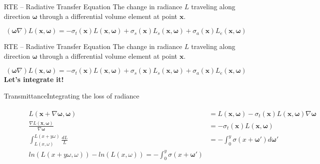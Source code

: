\documentclass[
  english,            %
  aspectratio=169,    %
]{tumbeamer}
\newcommand\bx[0]{\textbf{x}}
\newcommand\bomega[0]{\boldsymbol{\omega}}
\begin{document}
\begin{frame}{RTE -- Radiative Transfer Equation}
    The change in radiance $L$ traveling along direction $\boldsymbol{\omega}$
    through a differential volume element at point $\boldsymbol{x}$.
    \begin{figure}[ht]
        \centering
        \scalebox{.7}{
            
        }
    \end{figure}
    \begin{equation} 
        \label{eq:RTE}
        (\bomega \nabla)L(\bx,\bomega) =
        - \sigma_t(\bx)L(\bx,\bomega)
        + \sigma_s(\bx)L_s(\bx,\bomega) + \sigma_a(\bx)L_e(\bx,\bomega)
    \end{equation}
\end{frame}

\begin{frame}{RTE -- Radiative Transfer Equation}
    The change in radiance $L$ traveling along direction $\boldsymbol{\omega}$
    through a differential volume element at point $\boldsymbol{x}$.
    \begin{figure}[ht]
        \centering
        \scalebox{.7}{
            
        }
    \end{figure}
    \begin{equation} 
        \label{eq:RTE}
        (\bomega \nabla)L(\bx,\bomega) =
        - \sigma_t(\bx)L(\bx,\bomega)
        + \sigma_s(\bx)L_s(\bx,\bomega) + \sigma_a(\bx)L_e(\bx,\bomega)
    \end{equation}
    \centering
    \vfill
    \textbf{Let's integrate it!}
\end{frame}

\begin{frame}{Transmittance}{Integrating the loss of radiance}
\begin{figure}[ht]
    \centering
    \scalebox{.7}{
        
    }
    \begin{align}
    \begin{aligned}
        L(\bx + \nabla\bomega,\bomega) &= L(\bx,\bomega)
        - \sigma_t(\bx)L(\bx,\bomega)\nabla\bomega \\ 
        \frac{\nabla L(\bx,\bomega)}{\nabla\bomega} &=
        - \sigma_t(\bx)L(\bx,\bomega) \\
        \int_{L(x,\omega)}^{L(x+y\omega)} \frac{dL}{L} &= -\int_0^y
        \sigma(x+\bomega')d\bomega'\\
        ln(L(x+y\omega,\omega)) - ln(L(x,\omega)) = - \int_0^y \sigma(x+\bomega')
    \end{aligned}
    \end{align}

\end{figure}
\end{frame}
\end{document}
